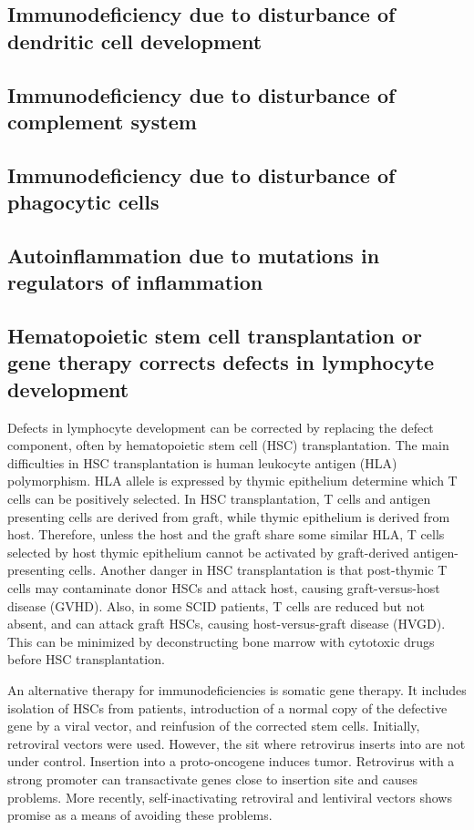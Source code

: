 \documentclass[11pt]{article}
\begin{document}
\begin{sloppypar}
\subsection{Immunodeficiency due to disturbance of dendritic cell development}

\subsection{Immunodeficiency due to disturbance of complement system}

\subsection{Immunodeficiency due to disturbance of phagocytic cells}

\subsection{Autoinflammation due to mutations in regulators of inflammation}

\subsection{Hematopoietic stem cell transplantation or gene therapy corrects defects in lymphocyte development}
Defects in lymphocyte development can be corrected by replacing the defect component, often by hematopoietic stem cell (HSC) transplantation. 
The main difficulties in HSC transplantation is human leukocyte antigen (HLA) polymorphism. 
HLA allele is expressed by thymic epithelium determine which T cells can be positively selected. 
In HSC transplantation, T cells and antigen presenting cells are derived from graft, while thymic epithelium is derived from host. 
Therefore, unless the host and the graft share some similar HLA, T cells selected by host thymic epithelium cannot be activated by graft-derived antigen-presenting cells. 
Another danger in HSC transplantation is that post-thymic T cells may contaminate donor HSCs and attack host, causing graft-versus-host disease (GVHD). 
Also, in some SCID patients, T cells are reduced but not absent, and can attack graft HSCs, causing host-versus-graft disease (HVGD). 
This can be minimized by deconstructing bone marrow with cytotoxic drugs before HSC transplantation. 

\par

An alternative therapy for immunodeficiencies is somatic gene therapy. 
It includes isolation of HSCs from patients, introduction of a normal copy of the defective gene by a viral vector, and reinfusion of the corrected stem cells. 
Initially, retroviral vectors were used. 
However, the sit where retrovirus inserts into are not under control. 
Insertion into a proto-oncogene induces tumor. 
Retrovirus with a strong promoter can transactivate genes close to insertion site and causes problems. 
More recently, self-inactivating retroviral and lentiviral vectors shows promise as a means of avoiding these problems. 


\end{sloppypar}
\end{document}
